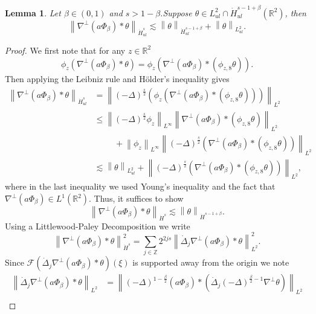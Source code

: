 \documentclass[12pt,xcolor=svgnames]{amsart}
\newtheorem{lemma}[theorem]{Lemma}
\newcommand{\R}{\mathbb{R}}
\newcommand{\norm}[2]{\left\lVert#1\right\rVert_{#2}}
\begin{document}
\begin{lemma}
\label{near field Hsul estimate}
Let $\beta \in (0,1)$ and $s>1-\beta$.Suppose $\theta \in L_{ul}^2 \cap \dot{H}_{ul}^{s-1+\beta}(\R^2)$, then 
\begin{equation}
\label{near field homogeneuous velocity estimate}
\norm{\nabla^{\perp}(a \Phi_{\beta})\ast \theta}{\dot{H}_{ul}^s} \lesssim \norm{\theta}{\dot{H}_{ul}^{s-1+\beta}} + \norm{\theta}{L_{ul}^2}.
\end{equation}
\end{lemma}
\begin{proof}
We first note that for any $z\in \R^2$  
\begin{equation}
\phi_z(\nabla^{\perp}(a\Phi_{\beta})\ast\theta)=\phi_z(\nabla^{\perp}(a\Phi_{\beta})\ast(\phi_{z,8}\theta)).
\end{equation}
Then applying the Leibniz rule and Hölder's inequality gives
\begin{align*}
\norm{\nabla^{\perp}(a \Phi_{\beta})\ast \theta}{\dot{H}_{ul}^s} &= \norm{(-\Delta)^{\frac{s}{2}}(\phi_z(\nabla^{\perp}(a\Phi_{\beta})\ast(\phi_{z,8}\theta)))}{L^2}\\
&\leq \norm{(-\Delta)^{\frac{s}{2}}\phi_z}{L^{\infty}}\norm{\nabla^{\perp}(a\Phi_{\beta})\ast(\phi_{z,8}\theta)}{L^2}\\ & \hspace{1cm}+ \norm{\phi_z}{L^{\infty}}\norm{(-\Delta)^{\frac{s}{2}}(\nabla^{\perp}(a\Phi_{\beta}) \ast (\phi_{z,8}\theta))}{L^2}\\
&\lesssim \norm{\theta}{L_{ul}^2} + \norm{(-\Delta)^{\frac{s}{2}}(\nabla^{\perp}(a\Phi_{\beta}) \ast (\phi_{z,8}\theta))}{L^2},
\end{align*}
where in the last inequality we used Young's inequality and the fact that $\nabla^{\perp}(a\Phi_{\beta})\in L^1(\R^2)$. Thus, it suffices to show 
$$\norm{\nabla^{\perp}(a\Phi_{\beta}) \ast \theta}{\dot{H}^s}  \lesssim \norm{\theta}{\dot{H}^{s-1+\beta}}. 
$$ 
Using a Littlewood-Paley Decomposition we write
\begin{equation}
\label{LPD pre bernstein}
\norm{\nabla^{\perp}(a\Phi_{\beta})\ast \theta}{\dot{H}^s}^2 = \sum_{j \in \mathbb{Z}} 2^{2js}\norm{\dot{
\Delta}_j \nabla^{\perp}(a\Phi_{\beta})\ast \theta}{L^2}^2.
\end{equation}
Since $\mathcal{F}\left(\dot{
\Delta}_j \nabla^{\perp}(a\Phi_{\beta})\ast \theta\right)(\xi)$ is supported away from the origin we note 
\begin{align*}
\norm{\dot{
\Delta}_j \nabla^{\perp}(a\Phi_{\beta})\ast \theta}{L^2} &=  \norm{(-\Delta)^{1-\frac{\beta}{2}}(a\Phi_{\beta})\ast(\dot{\Delta}_j(-\Delta)^{\frac{\beta}{2}-1}\nabla^{\perp}\theta)}{L^2} \\

\end{align*}
\end{proof}
\end{document}
